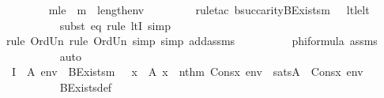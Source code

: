 \begin{isabellebody}
\isanewline
\ \ \ \ \ \ \isamarkupfalse%
\ mle\ {\isacharcolon}{\kern0pt}\ {\isachardoublequoteopen}m\ {\isasymle}\ length{\isacharparenleft}{\kern0pt}env{\isacharparenright}{\kern0pt}{\isachardoublequoteclose}\isanewline
\ \ \ \ \ \ \ \ \isamarkupfalse%
{\isacharparenleft}{\kern0pt}rule{\isacharunderscore}{\kern0pt}tac\ b{\isacharequal}{\kern0pt}{\isachardoublequoteopen}succ{\isacharparenleft}{\kern0pt}arity{\isacharparenleft}{\kern0pt}BExists{\isacharprime}{\kern0pt}{\isacharparenleft}{\kern0pt}m{\isacharcomma}{\kern0pt}\ {\isasymphi}{\isacharparenright}{\kern0pt}{\isacharparenright}{\kern0pt}{\isacharparenright}{\kern0pt}{\isachardoublequoteclose}\ \ lt{\isacharunderscore}{\kern0pt}le{\isacharunderscore}{\kern0pt}lt{\isacharparenright}{\kern0pt}\isanewline
\ \ \ \ \ \ \ \ \ \isamarkupfalse%
{\isacharparenleft}{\kern0pt}subst\ eq{\isacharcomma}{\kern0pt}\ rule\ ltI{\isacharcomma}{\kern0pt}\ simp{\isacharparenright}{\kern0pt}\isanewline
\ \ \ \ \ \ \ \ \ \isamarkupfalse%
{\isacharparenleft}{\kern0pt}rule\ Ord{\isacharunderscore}{\kern0pt}Un{\isacharcomma}{\kern0pt}\ rule\ Ord{\isacharunderscore}{\kern0pt}Un{\isacharcomma}{\kern0pt}\ simp{\isacharcomma}{\kern0pt}\ simp\ add{\isacharcolon}{\kern0pt}assms{}{\isacharparenright}{\kern0pt}\isanewline
\ \ \ \ \ \ \ \ \isamarkupfalse%
\ phiformula\ assms{}\ \isanewline
\ \ \ \ \ \ \ \ \isamarkupfalse%
\ auto\isanewline
\isanewline
\ \ \ \ \ \ \isamarkupfalse%
\ I{}\ {\isacharcolon}{\kern0pt}\ {\isachardoublequoteopen}A{\isacharcomma}{\kern0pt}\ env\ {\isasymTurnstile}\ BExists{\isacharprime}{\kern0pt}{\isacharparenleft}{\kern0pt}m{\isacharcomma}{\kern0pt}\ {\isasymphi}{\isacharparenright}{\kern0pt}\ {\isasymlongleftrightarrow}\ {\isacharparenleft}{\kern0pt}{\isasymexists}x\ {\isasymin}\ A{\isachardot}{\kern0pt}\ x\ {\isasymin}\ nth{\isacharparenleft}{\kern0pt}m{\isacharcomma}{\kern0pt}\ Cons{\isacharparenleft}{\kern0pt}x{\isacharcomma}{\kern0pt}\ env{\isacharparenright}{\kern0pt}{\isacharparenright}{\kern0pt}\ {\isasymand}\ sats{\isacharparenleft}{\kern0pt}A{\isacharcomma}{\kern0pt}\ {\isasymphi}{\isacharcomma}{\kern0pt}\ Cons{\isacharparenleft}{\kern0pt}x{\isacharcomma}{\kern0pt}\ env{\isacharparenright}{\kern0pt}{\isacharparenright}{\kern0pt}{\isacharparenright}{\kern0pt}{\isachardoublequoteclose}\isanewline
\ \ \ \ \ \ \ \ \isamarkupfalse%
\ BExists{\isacharprime}{\kern0pt}{\isacharunderscore}{\kern0pt}def\ \isanewline

\end{isabellebody}
